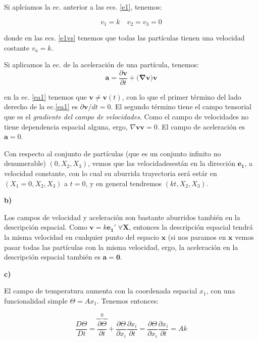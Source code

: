 \documentclass[10pt,a4paper]{article}
\theoremstyle{definition}
\begin{document}
Si aplciamos la ec. anterior a las ecs. \eqref{e1}, tenemos:

\begin{equation}\label{e1vs}
v_1 = k \quad v_2 = v_3 = 0
\end{equation}

\noindent donde en las ecs. \eqref{e1vs} tenemos que todas las partículas tienen una velocidad costante $v_a = k$.

Si aplicamos la ec. de la aceleración de una partícula, tenemos:
\begin{equation}\label{ea1}
\mathbf{a} = \frac{\partial \mathbf{v}}{\partial t} + \Big(  \mathbf{\nabla v} \Big) \mathbf{v}
\end{equation}

\noindent en la ec. \eqref{ea1} tenemos que $\mathbf{v} \neq \mathbf{v}(t)$, con lo que el primer término del lado derecho de la ec.\eqref{ea1} es $\partial \mathbf{v} / dt = 0$. El segundo término tiene el campo tensorial que es el \textit{gradiente del campo de velocidades}. Como el campo de velocidades no tiene dependencia espacial alguna, ergo, $\nabla \mathbf{v}\mathbf{v} = 0$. El campo de aceleración es $\mathbf{a} = 0$.

Con respecto al conjunto de partículas (que es un conjunto infinito no denumerable)  $(0,X_2,X_3)$, vemos que las velocidadesestán en la dirección $\mathbf{e_1}$, a velocidad constante, con lo cual su aburrida trayectoria será estár en $(X_1 = 0,X_2,X_3)$ a $t = 0$, y en general tendremos $(kt, X_2,X_3)$.


\pagebreak

\textbf{b)}

Los campos de velocidad y aceleración son bastante aburridos también en la descripción espacial. Como $\mathbf{v} = k \mathbf{e_1}'\; \forall \mathbf{X}$, entonces la descripción espacial tendrá la misma velocidad en cualquier punto del espacio $\mathbf{x}$ (si nos paramos en $\mathbf{x}$ vemos pasar todas las partículas con la misma velocidad, ergo, la aceleración en la descripción espacial también es $\mathbf{a} = \mathbf{0}$.

\textbf{c)}

El campo de temperatura aumenta con la coordenada espacial $x_1$, con una funcionalidad simple $\Theta  = Ax_1$. Tenemos entonces:

\begin{equation}
\frac{D \Theta}{D t} = \overbrace{\frac{\partial \Theta}{\partial t}}^0 + \frac{\partial \Theta}{\partial x_i} \frac{\partial x_i}{\partial t} = \frac{\partial \Theta}{\partial x_i} \frac{\partial x_i}{\partial t} = A k 
\end{equation}
\end{document}
